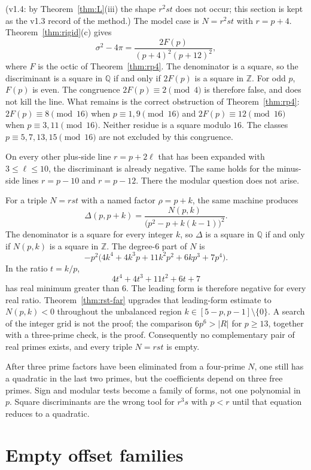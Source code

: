 \documentclass[11pt,reqno]{amsart}
\theoremstyle{definition}
\begin{document}
(v1.4: by Theorem~\ref{thm:L}(iii) the shape \(r^2st\) does not occur; this section is kept as the v1.3 record of the method.) The model case is \(N=r^2st\) with \(r=p+4\). Theorem~\ref{thm:rigid}(c) gives
\[
\sigma^2-4\pi=\frac{2F(p)}{(p+4)^2(p+12)^2},
\]
where \(F\) is the octic of Theorem~\ref{thm:rp4}. The denominator is a square, so the discriminant is a square in \(\mathbb{Q}\) if and only if \(2F(p)\) is a square in \(\mathbb{Z}\). For odd \(p\), \(F(p)\) is even. The congruence \(2F(p)\equiv 2\pmod{4}\) is therefore false, and does not kill the line. What remains is the correct obstruction of Theorem~\ref{thm:rp4}: \(2F(p)\equiv 8\pmod{16}\) when \(p\equiv 1,9\pmod{16}\) and \(2F(p)\equiv 12\pmod{16}\) when \(p\equiv 3,11\pmod{16}\). Neither residue is a square modulo \(16\). The classes \(p\equiv 5,7,13,15\pmod{16}\) are not excluded by this congruence.

On every other plus-side line \(r=p+2\ell\) that has been expanded with \(3\le\ell\le 10\), the discriminant is already negative. The same holds for the minus-side lines \(r=p-10\) and \(r=p-12\). There the modular question does not arise.

For a triple \(N=rst\) with a named factor \(\rho=p+k\), the same machine produces
\[
\Delta(p,p+k)=\frac{N(p,k)}{\bigl(p^2-p+k(k-1)\bigr)^2}.
\]
The denominator is a square for every integer \(k\), so \(\Delta\) is a square in \(\mathbb{Q}\) if and only if \(N(p,k)\) is a square in \(\mathbb{Z}\). The degree-\(6\) part of \(N\) is
\[
-p^2\bigl(4k^4+4k^3p+11k^2p^2+6kp^3+7p^4\bigr).
\]
In the ratio \(t=k/p\),
\[
4t^4+4t^3+11t^2+6t+7
\]
has real minimum greater than \(6\). The leading form is therefore negative for every real ratio. Theorem~\ref{thm:rst-far} upgrades that leading-form estimate to \(N(p,k)<0\) throughout the unbalanced region \(k\in[5-p,p-1]\setminus\{0\}\). A search of the integer grid is not the proof; the comparison \(6p^6>\lvert R\rvert\) for \(p\ge 13\), together with a three-prime check, is the proof. Consequently no complementary pair of real primes exists, and every triple \(N=rst\) is empty.

After three prime factors have been eliminated from a four-prime \(N\), one still has a quadratic in the last two primes, but the coefficients depend on three free primes. Sign and modular tests become a family of forms, not one polynomial in \(p\). Square discriminants are the wrong tool for \(r^3s\) with \(p<r\) until that equation reduces to a quadratic.

\section{Empty offset families}
\label{sec:offsets}
\end{document}

